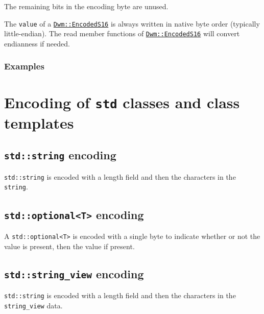The remaining bits in the encoding byte are unused.

The \texttt{value} of a
\hyperref[class:EncodedS16]{\texttt{Dwm::EncodedS16}} is always
written in native byte order (typically little-endian).  The read
member functions of
\hyperref[class:EncodedS16]{\texttt{Dwm::EncodedS16}} will convert
endianness if needed.

\subsubsection{Examples}





\section{Encoding of \texttt{std} classes and class templates}

\subsection{\texttt{std::string} encoding}
\texttt{std::string} is encoded with a length field and then
the characters in the \texttt{string}.


\subsection{\texttt{std::optional<T>} encoding}\label{encoding:stdOptional}
A \texttt{std::optional<T>} is encoded with a single byte to indicate whether
or not the value is present, then the value if present.


\subsection{\texttt{std::string\_view} encoding}
\texttt{std::string} is encoded with a length field and then
the characters in the \texttt{string\_view} data.

